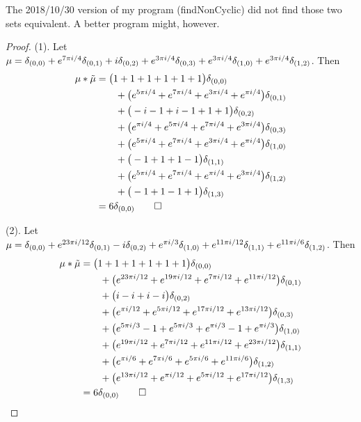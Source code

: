 \begin{rem}
The 2018/10/30 version of my program (findNonCyclic) did not find those two sets equivalent. A better program might, however.
\end{rem}
 

 
\begin{proof} (1). 
Let  $\mu =  \delta_{(0,0)}+e^{7\pi i/4}\delta_{(0,1)}+i\delta_{(0,2)}+e^{3\pi i/4}\delta_{(0,3)}+e^{3\pi i/4}\delta_{(1,0)}+e^{3\pi i/4}\delta_{(1,2)}
$.  Then 
\begin{align*} 
\mu * \tilde \mu & = \big(1+1+1+1+1+1\big)\delta_{(0,0)}
\\&\qquad
+\big(e^{5\pi i/4}+e^{7\pi i/4}+e^{3\pi i/4}+e^{\pi i/4}\big)\delta_{(0,1)}
\\&\qquad
+\big(-i-1+i-1+1+1\big)\delta_{(0,2)}
\\&\qquad
+\big(e^{\pi i/4}+e^{5\pi i/4}+e^{7\pi i/4}+e^{3\pi i/4}\big)\delta_{(0,3)}
\\&\qquad
+\big(e^{5\pi i/4}+e^{7\pi i/4}+e^{3\pi i/4}+e^{\pi i/4}\big)\delta_{(1,0)}
\\&\qquad
+\big(-1+1+1-1\big)\delta_{(1,1)}
\\&\qquad
+\big(e^{5\pi i/4}+e^{7\pi i/4}+e^{\pi i/4}+e^{3\pi i/4}\big)\delta_{(1,2)}
\\&\qquad
+\big(-1+1-1+1\big)\delta_{(1,3)}\\&=6\delta_{(0 , 0)}\qedhere
\end{align*}


(2). 
Let  $\mu =  \delta_{(0,0)}+e^{23\pi i/12}\delta_{(0,1)}-i\delta_{(0,2)}+e^{\pi i/3}\delta_{(1,0)}+e^{11\pi i/12}\delta_{(1,1)}+e^{11\pi i/6}\delta_{(1,2)}
$.  Then 
\begin{align*} 
\mu * \tilde \mu & = \big(1+1+1+1+1+1\big)\delta_{(0,0)}
\\&\qquad
+\big(e^{23\pi i/12}+e^{19\pi i/12}+e^{7\pi i/12}+e^{11\pi i/12}\big)\delta_{(0,1)}
\\&\qquad
+\big(i-i+i-i\big)\delta_{(0,2)}
\\&\qquad
+\big(e^{\pi i/12}+e^{5\pi i/12}+e^{17\pi i/12}+e^{13\pi i/12}\big)\delta_{(0,3)}
\\&\qquad
+\big(e^{5\pi i/3}-1+e^{5\pi i/3}+e^{\pi i/3}-1+e^{\pi i/3}\big)\delta_{(1,0)}
\\&\qquad
+\big(e^{19\pi i/12}+e^{7\pi i/12}+e^{11\pi i/12}+e^{23\pi i/12}\big)\delta_{(1,1)}
\\&\qquad
+\big(e^{\pi i/6}+e^{7\pi i/6}+e^{5\pi i/6}+e^{11\pi i/6}\big)\delta_{(1,2)}
\\&\qquad
+\big(e^{13\pi i/12}+e^{\pi i/12}+e^{5\pi i/12}+e^{17\pi i/12}\big)\delta_{(1,3)}\\&=6\delta_{(0 , 0)}\qedhere
\end{align*}
\end{proof}

